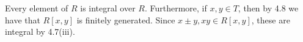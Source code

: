 Every element of $R$ is integral over $R$. Furthermore, if $x, y \in T$, then
by 4.8 we have that $R[x, y]$ is finitely generated. Since $x\pm y, xy \in R[x, y]$,
these are integral by 4.7(iii).
